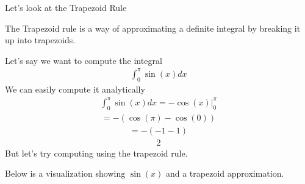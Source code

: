 \documentclass[letterpaper,10pt,english]{jupyterBook}
\begin{document}
\sphinxAtStartPar
Let’s look at the Trapezoid Rule

\sphinxAtStartPar
The Trapezoid rule is a way of approximating a definite integral by breaking it up into trapezoids.

\sphinxAtStartPar
Let’s say we want to compute the integral
\begin{equation*}
\begin{split} \int_0^{\pi} \sin(x)dx \end{split}
\end{equation*}
\sphinxAtStartPar
We can easily compute it analytically
\begin{equation*}
\begin{split} \int_0^{\pi} \sin(x)dx = -\cos(x) \big|_0^{\pi} \end{split}
\end{equation*}\begin{equation*}
\begin{split} =-(\cos(\pi) - \cos(0)) \end{split}
\end{equation*}\begin{equation*}
\begin{split} = -(-1 - 1)\end{split}
\end{equation*}\begin{equation*}
\begin{split} 2 \end{split}
\end{equation*}
\sphinxAtStartPar
But let’s try computing using the trapezoid rule.

\sphinxAtStartPar
Below is a visualization showing \(\sin(x)\) and a trapezoid approximation.
\end{document}
